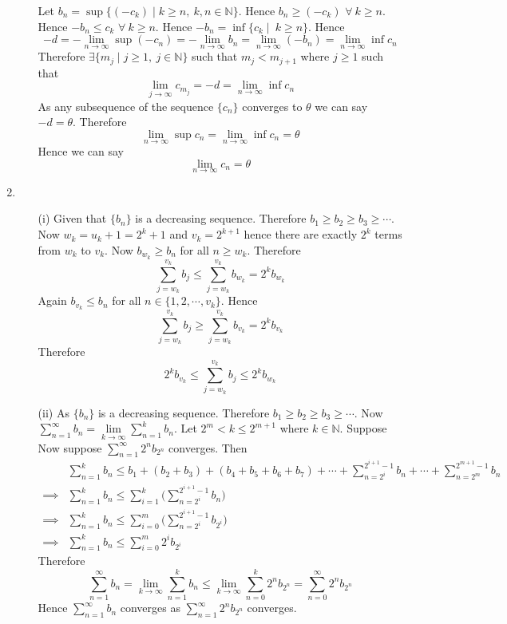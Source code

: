 \documentclass{article}
\begin{document}
\begin{enumerate}
\begin{enumerate}
	\hspace{1cm}Let $b_n=\sup\{(-c_k)\mid k\geq n,\ k,n\in\mathbb{N}\}$. Hence $b_n\geq (-c_k)$ $\forall \ k\geq n$. Hence $-b_n\leq c_k$ $\forall\ k\geq n$. Hence $-b_n=\inf\{c_k\mid\ k\geq n\}$. Hence $$-d=-\lim\limits_{n\to\infty}\sup (-c_n)=-\lim\limits_{n\to\infty}b_n=\lim\limits_{n\to\infty}(-b_n)=\lim\limits_{n\to\infty}\inf c_n$$Therefore $\exists \{m_j\mid j\geq 1,\ j\in\mathbb{N}\} $ such that $m_j<m_{j+1}$ where $j\geq 1$ such that $$\lim\limits_{j\to\infty}c_{m_j}=-d=\lim\limits_{n\to\infty}\inf c_n$$As any subsequence of the sequence $\{c_n\}$ converges to $\theta$ we can say $-d=\theta.$ Therefore$$\lim\limits_{n\to\infty}\sup c_n=\lim\limits_{n\to\infty}\inf c_n=\theta$$Hence we can say $$\lim\limits_{n\to\infty} c_n=\theta$$
\end{enumerate}
\item\begin{enumerate}
	\item[(i)] Given that $\{b_n\}$ is a decreasing sequence. Therefore $b_1\geq b_2\geq b_3\geq\cdots$. Now $w_k=u_k+1=2^k+1$ and $v_k=2^{k+1}$ hence there are exactly $2^k$ terms from $w_k$ to $v_k$. Now $b_{w_k}\geq b_n$ for all $n\geq w_k$. Therefore $$\sum\limits_{j=w_k}^{v_k}b_j\leq \sum\limits_{j=w_k}^{v_k}b_{w_k}=2^kb_{w_k}$$Again $b_{v_k}\leq b_n$ for all $n\in\{1,2,\cdots,v_k\}$. Hence$$\sum\limits_{j=w_k}^{v_k}b_j\geq \sum\limits_{j=w_k}^{v_k}b_{v_k}=2^kb_{v_k}$$Therefore$$2^kb_{v_k}\leq \sum\limits_{j=w_k}^{v_k}b_j\leq 2^kb_{w_k}$$
	\item[(ii)] As $\{b_n\}$ is a decreasing sequence. Therefore $b_1\geq b_2\geq b_3\geq\cdots$. Now  $\sum\limits_{n=1}^{\infty}b_n=\lim\limits_{k\to\infty}\sum\limits_{n=1}^kb_n$. Let $2^m<k\leq 2^{m+1}$ where $k\in\mathbb{N}$. Suppose Now suppose $\sum\limits_{n=1}^{\infty}2^nb_{2^n}$ converges.  Then\begin{align*}
		& \sum\limits_{n=1}^kb_n\leq b_1+(b_2+b_3)+(b_4+b_5+b_6+b_7)+\cdots+\sum\limits_{n=2^i}^{2^{i+1}-1}b_n+\cdots+\sum\limits_{n=2^m}^{2^{m+1}-1}b_n\\
		\implies & \sum\limits_{n=1}^kb_n\leq \sum\limits_{i=1}^{k}\Bigg(\sum\limits_{n=2^i}^{2^{i+1}-1}b_n\Bigg)\\
		\implies & \sum\limits_{n=1}^kb_n\leq \sum\limits_{i=0}^{m}\Bigg(\sum\limits_{n=2^i}^{2^{i+1}-1}b_{2^i}\Bigg)\\
		\implies & \sum\limits_{n=1}^kb_n\leq \sum\limits_{i=0}^{m}2^ib_{2^i}
	\end{align*}Therefore$$\sum\limits_{n=1}^{\infty}b_n=\lim\limits_{k\to\infty}\sum\limits_{n=1}^kb_n\leq \lim\limits_{k\to\infty}\sum\limits_{n=0}^k2^nb_{2^n}=\sum\limits_{n=0}^{\infty}2^nb_{2^n}$$Hence $\sum\limits_{n=1}^{\infty}b_n$ converges  as  $\sum\limits_{n=1}^{\infty}2^nb_{2^n}$ converges. 


\end{enumerate}
\end{enumerate}
\end{document}
